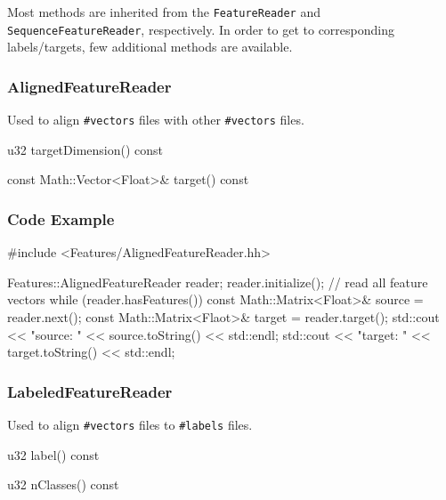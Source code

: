 Most methods are inherited from the \texttt{FeatureReader} and \texttt{SequenceFeatureReader}, respectively. In order to get to corresponding labels/targets, few additional methods are available.

\subsubsection*{AlignedFeatureReader}

Used to align \texttt{\#vectors} files with other \texttt{\#vectors} files.

\begin{fdoc}{u32 targetDimension() const}
\end{fdoc}

\begin{fdoc}{const Math::Vector<Float>\& target() const}
\end{fdoc}

\subsubsection*{Code Example}
\begin{code}
#include <Features/AlignedFeatureReader.hh>

Features::AlignedFeatureReader reader;
reader.initialize();
// read all feature vectors
while (reader.hasFeatures()) {
    const Math::Matrix<Float>& source = reader.next();
    const Math::Matrix<Flaot>& target = reader.target();
    std::cout << "source: " << source.toString() << std::endl;
    std::cout << "target: " << target.toString() << std::endl;
}
\end{code}

\subsubsection*{LabeledFeatureReader}

Used to align \texttt{\#vectors} files to \texttt{\#labels} files.

\begin{fdoc}{u32 label() const}
\end{fdoc}

\begin{fdoc}{u32 nClasses() const}
\end{fdoc}

